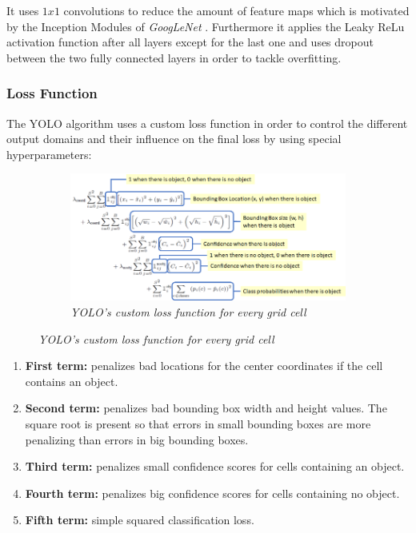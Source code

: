 It uses $1 x 1$ convolutions to reduce the amount of feature maps which is
motivated by the Inception Modules of \textit{GoogLeNet} \cite{yolo_3}.
Furthermore it applies the Leaky ReLu activation function after all layers
except for the last one and uses dropout between the two fully connected layers
in order to tackle overfitting.

\subsubsection{Loss Function}
The YOLO algorithm uses a custom loss function in order to control the different
output domains and their influence on the final loss by using special
hyperparameters:

\begin{figure}[H]
    \centering
    \begin{subfigure}[b]{0.8\textwidth}
        \centering
        \includegraphics[width=\textwidth]{Figures/2. Related Work/yolo_5.png}
        \caption{\textit{YOLO's custom loss function for every grid cell} \cite{yolo_images}}
    \end{subfigure}
\end{figure}

\begin{enumerate}
    \item \textbf{First term:} penalizes bad locations for the center
          coordinates if the cell contains an object.
    \item \textbf{Second term:} penalizes bad bounding box width and height
          values. The square root is present so that errors in small bounding boxes
          are more penalizing than errors in big bounding boxes.
    \item \textbf{Third term:} penalizes small confidence scores for cells
          containing an object.
    \item \textbf{Fourth term:} penalizes big confidence scores for cells
          containing no object.
    \item \textbf{Fifth term:} simple squared classification loss.
\end{enumerate}

